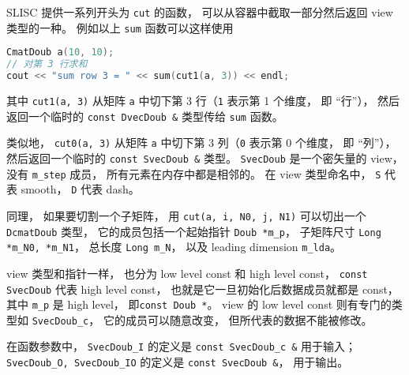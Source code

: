 SLISC 提供一系列开头为 \verb`cut` 的函数， 可以从容器中截取一部分然后返回 view 类型的一种。 例如以上 \verb`sum` 函数可以这样使用
\begin{lstlisting}[language=cpp]
CmatDoub a(10, 10);
// 对第 3 行求和
cout << "sum row 3 = " << sum(cut1(a, 3)) << endl;
\end{lstlisting}
其中 \verb`cut1(a, 3)` 从矩阵 \verb`a` 中切下第 3 行（\verb`1` 表示第 1 个维度， 即 “行”）， 然后返回一个临时的 \verb`const DvecDoub &` 类型传给 \verb`sum` 函数。

类似地， \verb`cut0(a, 3)` 从矩阵 \verb`a` 中切下第 3 列（\verb`0` 表示第 0 个维度， 即 “列”）， 然后返回一个临时的 \verb`const SvecDoub &` 类型。 \verb`SvecDoub` 是一个密矢量的 view， 没有 \verb`m_step` 成员， 所有元素在内存中都是相邻的。 在 view 类型命名中， \verb`S` 代表 smooth， \verb`D` 代表 dash。

同理， 如果要切割一个子矩阵， 用 \verb`cut(a, i, N0, j, N1)` 可以切出一个 \verb`DcmatDoub` 类型， 它的成员包括一个起始指针 \verb`Doub *m_p`， 子矩阵尺寸 \verb`Long *m_N0, *m_N1`， 总长度 \verb`Long m_N`， 以及 leading dimension \verb`m_lda`。

view 类型和指针一样， 也分为 low level const 和 high level const， \verb`const SvecDoub` 代表 high level const， 也就是它一旦初始化后数据成员就都是 const， 其中 \verb`m_p` 是 high level， 即\verb`const Doub *`。 view 的 low level const 则有专门的类型如 \verb`SvecDoub_c`， 它的成员可以随意改变， 但所代表的数据不能被修改。

在函数参数中， \verb`SvecDoub_I` 的定义是 \verb`const SvecDoub_c &` 用于输入； \verb`SvecDoub_O, SvecDoub_IO` 的定义是 \verb`const SvecDoub &`， 用于输出。

